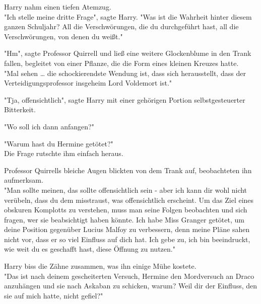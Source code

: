 {Harry nahm einen tiefen Atemzug.\\ "Ich stelle meine dritte Frage", sagte Harry. "Was ist die Wahrheit hinter diesem ganzen Schuljahr? All die Verschwörungen, die du durchgeführt hast, all die Verschwörungen, von denen du weißt."

"Hm", sagte Professor Quirrell und ließ eine weitere Glockenblume in den Trank fallen, begleitet von einer Pflanze, die die Form eines kleinen Kreuzes hatte.\\ "Mal sehen … die schockierendste Wendung ist, dass sich herausstellt, dass der Verteidigungsprofessor insgeheim Lord Voldemort ist."

"Tja, offensichtlich", sagte Harry mit einer gehörigen Portion selbstgesteuerter Bitterkeit.

"Wo soll ich dann anfangen?"

"Warum hast du Hermine getötet?"\\ Die Frage rutschte ihm einfach heraus.

Professor Quirrells bleiche Augen blickten von dem Trank auf, beobachteten ihn aufmerksam.\\ "Man sollte meinen, das sollte offensichtlich sein - aber ich kann dir wohl nicht verübeln, dass du dem misstraust, was offensichtlich erscheint. Um das Ziel eines obskuren Komplotts zu verstehen, muss man seine Folgen beobachten und sich fragen, wer sie beabsichtigt haben könnte. Ich habe Miss Granger getötet, um deine Position gegenüber Lucius Malfoy zu verbessern, denn meine Pläne sahen nicht vor, dass er so viel Einfluss auf dich hat. Ich gebe zu, ich bin beeindruckt, wie weit du es geschafft hast, diese Öffnung zu nutzen."

Harry biss die Zähne zusammen, was ihn einige Mühe kostete.\\ "Das ist nach deinem gescheiterten Versuch, Hermine den Mordversuch an Draco anzuhängen und sie nach Askaban zu schicken, warum? Weil dir der Einfluss, den sie auf mich hatte, nicht gefiel?"

}
